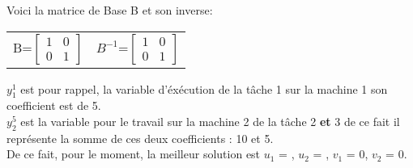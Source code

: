 \vspace{0.5cm}
Voici la matrice de Base B et son inverse: 
\\

\begin{center}
\begin{tabular}{c c}
B=$\begin{bmatrix}
1 & 0 \\
0 & 1
 \end{bmatrix} $                  
&
$B^{-1}$=$\begin{bmatrix}
1 & 0 \\
0 & 1
 \end{bmatrix} $             
\end{tabular}
\end{center}


$y_1^1$ est pour rappel, la variable d'éxécution de la tâche 1 sur la machine 1 son coefficient est de 5. \\
$y_2^5$ est la variable pour le travail sur la machine 2 de la tâche 2 \textbf{et} 3 de ce fait il représente la somme de ces deux coefficients : 10 et 5. \\

De ce fait, pour le moment, la meilleur solution est \textit{$u_1$} = ,  \textit{$u_2$} = , \textit{$v_1$} = 0, \textit{$v_2$} = 0.    \\

